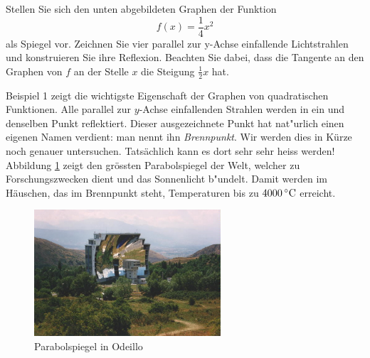 \documentclass[%
11pt,%
twoside,%
titlepage,%
german,%
headsepline%
]{scrartcl}
\begin{document}
\begin{bsp}
Stellen Sie sich den unten abgebildeten Graphen der Funktion
$$f(x) = \frac{1}{4}x^2$$
als Spiegel vor. Zeichnen Sie vier parallel zur y-Achse einfallende Lichtstrahlen und konstruieren Sie ihre Reflexion. Beachten Sie dabei, dass die Tangente an den Graphen von $f$ an der Stelle $x$ die Steigung $\frac{1}{2}x$ hat.
\begin{figure}
\begin{center}
\end{center}
\end{figure}
\end{bsp}
Beispiel 1 zeigt die wichtigste Eigenschaft der Graphen von quadratischen Funktionen. Alle parallel zur $y$-Achse einfallenden Strahlen werden in ein und denselben Punkt reflektiert. Dieser ausgezeichnete Punkt hat nat"urlich einen eigenen Namen verdient: man nennt ihn
\emph{Brennpunkt}. Wir werden dies in K\"urze noch genauer untersuchen.
Tats\"achlich kann es dort sehr sehr heiss werden! Abbildung \ref{odiello} zeigt den gr\"ossten Parabolspiegel der Welt, welcher zu Forschungszwecken dient und das Sonnenlicht \glqq b"undelt\grqq. Damit werden im H\"auschen, das im Brennpunkt steht, Temperaturen bis zu $\unit[4000]{ ^\circ C}$ erreicht.

\begin{figure}
\begin{center}
\includegraphics[width=0.618\textwidth]{pictures/odeillo}
\end{center}
\caption{Parabolspiegel in Odeillo}\label{odiello} 
\end{figure}
\end{document}
